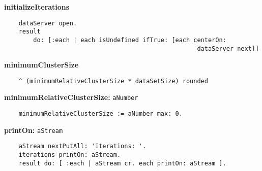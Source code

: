{\bf initializeIterations}
\begin{verbatim}
    dataServer open.
    result 
        do: [:each | each isUndefined ifTrue: [each centerOn: 
                                                     dataServer next]]
\end{verbatim}
{\bf minimumClusterSize}
\begin{verbatim}
    ^ (minimumRelativeClusterSize * dataSetSize) rounded
\end{verbatim}
{\bf minimumRelativeClusterSize:} {\tt aNumber}
\begin{verbatim}
    minimumRelativeClusterSize := aNumber max: 0.
\end{verbatim}
{\bf printOn:} {\tt aStream}
\begin{verbatim}
    aStream nextPutAll: 'Iterations: '.
    iterations printOn: aStream.
    result do: [ :each | aStream cr. each printOn: aStream ].
\end{verbatim}
